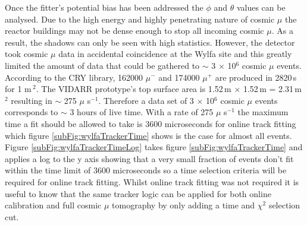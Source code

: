 Once the fitter's potential bias has been addressed the $\phi$ and $\theta$ values can be analysed. Due to the high energy and highly penetrating nature of cosmic $\mu$ \cite{Olive_2014} the reactor buildings may not be dense enough to stop all incoming cosmic $\mu$. As a result, the shadows can only be seen with high statistics. However, the detector took cosmic $\mu$ data in accidental coincidence at the Wylfa site and this greatly limited the amount of data that could be gathered to $\sim$ 3 $\times$ 10$^6$ cosmic $\mu$ events. According to the CRY library, \cite{ieee_cry_2007} 162000 $\mu^-$ and 174000 $\mu^+$ are produced in 2820\,s for 1 m\,$^2$. The VIDARR prototype's top surface area is 1.52\,m $\times$ 1.52\,m = 2.31\,m$^2$ resulting in $\sim$ 275 $\mu$ s$^{-1}$. Therefore a data set of 3 $\times$ 10$^6$ cosmic $\mu$ events corresponds to $\sim$ 3 hours of live time. With a rate of 275 $\mu$ s$^{-1}$ the maximum time a fit should be allowed to take is 3600 microseconds for online track fitting which figure \ref{subFig:wylfaTrackerTime} shows is the case for almost all events. Figure \ref{subFig:wylfaTrackerTimeLog} takes figure \ref{subFig:wylfaTrackerTime} and applies a log to the y axis showing that a very small fraction of events don't fit within the time limit of 3600 microseconds so a time selection criteria will be required for online track fitting. Whilst online track fitting was not required it is useful to know that the same tracker logic can be applied for both online calibration and full cosmic $\mu$ tomography by only adding a time and $\chi^2$ selection cut. 

